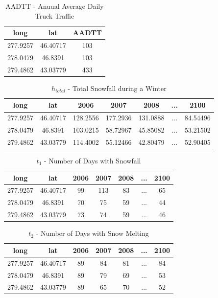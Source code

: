 \documentclass[12pt]{article}
\begin{document}
\begin{table}[H]
\centering
\begin{tabular}{|c|c|c|}
\hline 
 long & lat & AADTT \\

\hline
277.9257 & 46.40717 & 103 \\ \hline
278.0479 & 46.8391 & 103 \\ \hline
279.4862 & 43.03779 & 433  \\ \hline
\end{tabular}
\caption{AADTT - Anuual Average Daily Truck Traffic}
\label{Table:AADTT}
\end{table}


\begin{table}[H]
\centering
\begin{tabular}{|c|c|c|c|c|c|c|}
\hline 
 long & lat & 2006 & 2007 & 2008 & ... & 2100  \\

\hline
277.9257 & 46.40717 & 128.2556 & 177.2936 & 131.0888 & ... & 84.54496\\ \hline
278.0479 & 46.8391 & 103.0215 & 58.72967 & 45.85082 & ... & 53.21502 \\ \hline
279.4862 & 43.03779 & 114.4002  & 55.12466 & 42.80479 & ... & 52.90405\\ \hline
\end{tabular}
\caption{$h_{total}$ - Total Snowfall during a Winter}
\label{Table:htotal}
\end{table}


\begin{table}[H]
\centering
\begin{tabular}{|c|c|c|c|c|c|c|}
\hline 
 long & lat & 2006 & 2007 & 2008 & ... & 2100  \\

\hline
277.9257 & 46.40717 & 99 & 113 & 83 & ... & 65\\ \hline
278.0479 & 46.8391 & 70 & 75 & 59 & ... & 44 \\ \hline
279.4862 & 43.03779 & 73  & 74 & 59 & ... & 46\\ \hline
\end{tabular}
\caption{$t_1$ - Number of Days with Snowfall}
\label{Table:t1}
\end{table}

\begin{table}[H]
\centering
\begin{tabular}{|c|c|c|c|c|c|c|}
\hline 
 long & lat & 2006 & 2007 & 2008 & ... & 2100  \\

\hline
277.9257 & 46.40717 & 89 & 84 & 81 & ... & 84\\ \hline
278.0479 & 46.8391 & 89 & 79 & 69 & ... & 53 \\ \hline
279.4862 & 43.03779 & 89  & 65 & 70 & ... & 52\\ \hline
\end{tabular}
\caption{$t_2 $ - Number of Days with Snow Melting}
\label{Table:t2}
\end{table}
\end{document}
